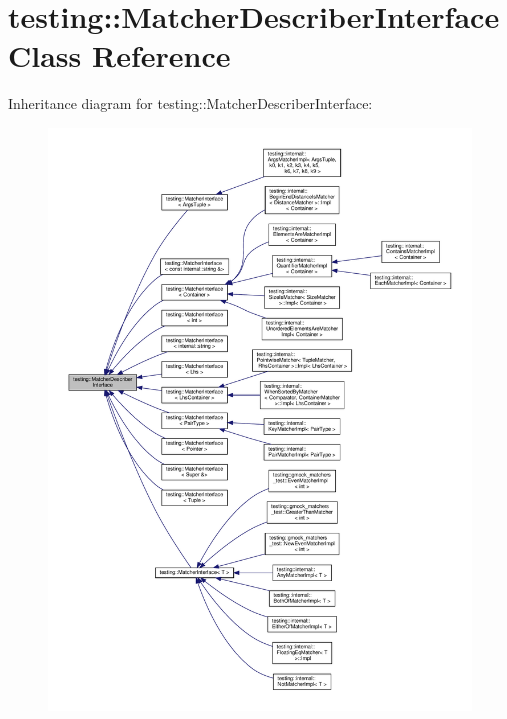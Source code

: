 \hypertarget{classtesting_1_1_matcher_describer_interface}{}\section{testing\+:\+:Matcher\+Describer\+Interface Class Reference}
\label{classtesting_1_1_matcher_describer_interface}


Inheritance diagram for testing\+:\+:Matcher\+Describer\+Interface\+:
\nopagebreak
\begin{figure}[H]
\begin{center}
\leavevmode
\includegraphics[width=350pt]{classtesting_1_1_matcher_describer_interface__inherit__graph}
\end{center}
\end{figure}
